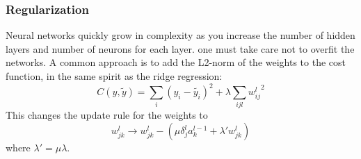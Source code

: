 \subsubsection{Regularization}

Neural networks quickly grow in complexity as you increase the number of hidden layers and number of neurons for each layer. one must take care not to overfit the networks. A common approach is to add the L2-norm of the weights to the cost function, in the same spirit as the ridge regression:
\begin{equation*}
    C(y, \tilde{y}) = \sum_i(y_i - \tilde{y_i})^2 + \lambda \sum_{ijl}{w^l_{ij}}^2
\end{equation*}
This changes the update rule for the weights to
\begin{equation}\label{eq:grad step}
    w^l_{jk} \rightarrow w^l_{jk} - (\mu \delta_j^l a_k^{l-1} + \lambda'w^l_{jk}) 
\end{equation}
where $\lambda' = \mu \lambda$.
